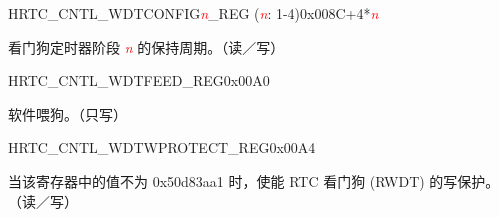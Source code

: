 \begin{register}{H}{RTC\_CNTL\_WDTCONFIG\textcolor{red}{\it{n}}\_REG (\textcolor{red}{\it{n}}: 1-4)}{0x008C+4*\textcolor{red}{\it{n}}}\label{regdesc:RTCCNTLWDTCONFIGnREG}
%
\regnewline%
\begin{regdesc}\begin{reglist}
 \item [RTC\_CNTL\_WDTCONFIG\textcolor{red}{\it{n}}\_REG] 看门狗定时器阶段 \textcolor{red}{\textit{n}} 的保持周期。（读／写）
\end{reglist}\end{regdesc}
\end{register}


\begin{register}{H}{RTC\_CNTL\_WDTFEED\_REG}{0x00A0}\label{regdesc:RTCCNTLWDTFEEDREG}
%
%
\regnewline%
\begin{regdesc}\begin{reglist}
\item [RTC\_CNTL\_WDT\_FEED]软件喂狗。（只写）
\end{reglist}\end{regdesc}
\end{register}


\begin{register}{H}{RTC\_CNTL\_WDTWPROTECT\_REG}{0x00A4}\label{regdesc:RTCCNTLWDTWPROTECTREG}
%
\regnewline%
\begin{regdesc}\begin{reglist}
\item [RTC\_CNTL\_WDTWPROTECT\_REG] 当该寄存器中的值不为 0x50d83aa1 时，使能 RTC 看门狗 (RWDT) 的写保护。（读／写）
\end{reglist}\end{regdesc}
\end{register}


